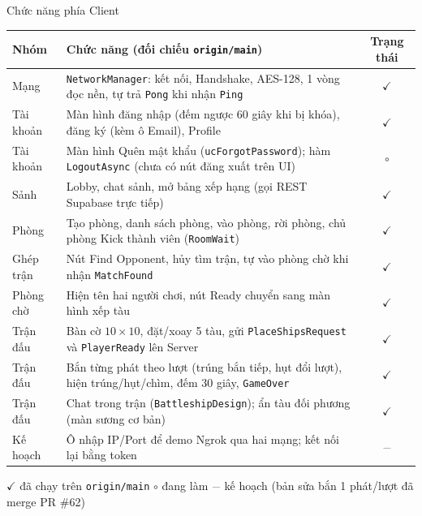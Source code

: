 \documentclass[aspectratio=169,9pt]{beamer}
\newcommand{\tickDone}{\textcolor{green!50!black}{$\checkmark$}}
\newcommand{\tickHalf}{\textcolor{orange!80!black}{$\circ$}}
\newcommand{\tickNone}{\textcolor{gray}{$-$}}
\begin{document}
\begin{frame}[label=tinhnangcl]{Chức năng phía Client}
  \scriptsize
  \renewcommand{\arraystretch}{1.04}
  \begin{tabularx}{\textwidth}{@{}l Y c@{}}
    \toprule \textbf{Nhóm} & \textbf{Chức năng (đối chiếu \texttt{origin/main})} & \textbf{Trạng thái} \\ \midrule
    Mạng & \texttt{NetworkManager}: kết nối, Handshake, AES-128, 1 vòng đọc nền, tự trả \texttt{Pong} khi nhận \texttt{Ping} & \tickDone \\
    Tài khoản & Màn hình đăng nhập (đếm ngược 60 giây khi bị khóa), đăng ký (kèm ô Email), Profile & \tickDone \\
    Tài khoản & Màn hình Quên mật khẩu (\texttt{ucForgotPassword}); hàm \texttt{LogoutAsync} (chưa có nút đăng xuất trên UI) & \tickHalf \\
    Sảnh & Lobby, chat sảnh, mở bảng xếp hạng (gọi REST Supabase trực tiếp) & \tickDone \\
    Phòng & Tạo phòng, danh sách phòng, vào phòng, rời phòng, chủ phòng Kick thành viên (\texttt{RoomWait}) & \tickDone \\
    Ghép trận & Nút Find Opponent, hủy tìm trận, tự vào phòng chờ khi nhận \texttt{MatchFound} & \tickDone \\
    Phòng chờ & Hiện tên hai người chơi, nút Ready chuyển sang màn hình xếp tàu & \tickDone \\
    Trận đấu & Bàn cờ $10\times10$, đặt/xoay 5 tàu, gửi \texttt{PlaceShipsRequest} và \texttt{PlayerReady} lên Server & \tickDone \\
    Trận đấu & Bắn từng phát theo lượt (trúng bắn tiếp, hụt đổi lượt), hiện trúng/hụt/chìm, đếm 30 giây, \texttt{GameOver} & \tickDone \\
    Trận đấu & Chat trong trận (\texttt{BattleshipDesign}); ẩn tàu đối phương (màn sương cơ bản) & \tickDone \\
    Kế hoạch & Ô nhập IP/Port để demo Ngrok qua hai mạng; kết nối lại bằng token & \tickNone \\
    \bottomrule
  \end{tabularx}
  \par\vspace{0.05cm}
  {\tiny \tickDone{} đã chạy trên \texttt{origin/main} \quad \tickHalf{} đang làm \quad \tickNone{} kế hoạch (bản sửa bắn 1 phát/lượt đã merge PR \#62)}
\end{frame}
\end{document}
